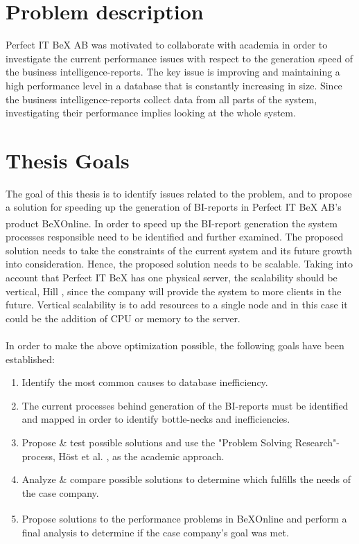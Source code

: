 \documentclass{cslthse-msc}
\newcommand{\bex}{BeX\textsuperscript{\textregistered}}
\begin{document}
\section{Problem description}
Perfect IT BeX AB was motivated to collaborate with academia in order to investigate the current performance issues with respect to the generation speed of the business intelligence-reports. The key issue is improving and maintaining a high performance level in a database that is constantly increasing in size. Since the business intelligence-reports collect data from all parts of the system, investigating their performance implies looking at the whole system.

\section{Thesis Goals} \label{sec:goals}
The goal of this thesis is to identify issues related to the problem, and to propose a solution for speeding up the generation of BI-reports in Perfect IT BeX AB's product \bex Online. In order to speed up the BI-report generation the system processes responsible need to be identified and further examined. The proposed solution needs to take the constraints of the current system and its future growth into consideration. Hence, the proposed solution needs to be scalable. Taking into account that Perfect IT BeX has one physical server, the scalability should be vertical, Hill \cite{scalability}, since the company will provide the system to more clients in the future. Vertical scalability is to add resources to a single node and in this case it could be the addition of CPU or memory to the server.\\\\
In order to make the above optimization possible, the following goals have been established:
\begin{enumerate}
\item Identify the most common causes to database inefficiency.
\item The current processes behind generation of the BI-reports must be identified and mapped in order to identify bottle-necks and inefficiencies.
\item Propose \& test possible solutions and use the "Problem Solving Research"-process, Höst et al. \cite{regnell}, as the academic approach.
\item Analyze \& compare possible solutions to determine which fulfills the needs of the case company.
\item Propose solutions to the performance problems in \bex Online and perform a final analysis to determine if the case company's goal was met.
\end{enumerate}
  
\end{document}
